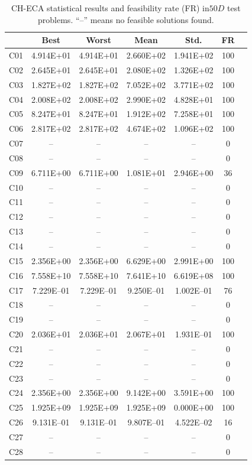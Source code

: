 \documentclass[conference]{IEEEtran}
\begin{document}
% 
% 
% 
\begin{table}[!]
	\caption{CH-ECA statistical results and feasibility rate (FR) in$50D$ test problems. ``--'' means no feasible solutions found.}
	\centering
	\begin{tabular}{|c|c|c|c|c|c|c|}
	\hline
     & Best & Worst & Mean & Std. & FR \\ \hline \hline
C01 & 4.914E+01 & 4.914E+01 & 2.660E+02 & 1.941E+02 &  100 \\ 
C02 & 2.645E+01 & 2.645E+01 & 2.080E+02 & 1.326E+02 &  100 \\ 
C03 & 1.827E+02 & 1.827E+02 & 7.052E+02 & 3.771E+02 &  100 \\ 
C04 & 2.008E+02 & 2.008E+02 & 2.990E+02 & 4.828E+01 &  100 \\ 
C05 & 8.247E+01 & 8.247E+01 & 1.912E+02 & 7.258E+01 &  100 \\ 
C06 & 2.817E+02 & 2.817E+02 & 4.674E+02 & 1.096E+02 &  100 \\ 
C07 &  -- &  -- &  -- &  -- &    0 \\ 
C08 &  -- &  -- &  -- &  -- &    0 \\ 
C09 & 6.711E+00 & 6.711E+00 & 1.081E+01 & 2.946E+00 &   36 \\ 
C10 &  -- &  -- &  -- &  -- &    0 \\ 
C11 &  -- &  -- &  -- &  -- &    0 \\ 
C12 &  -- &  -- &  -- &  -- &    0 \\ 
C13 &  -- &  -- &  -- &  -- &    0 \\ 
C14 &  -- &  -- &  -- &  -- &    0 \\ 
C15 & 2.356E+00 & 2.356E+00 & 6.629E+00 & 2.991E+00 &  100 \\ 
C16 & 7.558E+10 & 7.558E+10 & 7.641E+10 & 6.619E+08 &  100 \\ 
C17 & 7.229E--01 & 7.229E--01 & 9.250E--01 & 1.002E--01 &   76 \\ 
C18 &  -- &  -- &  -- &  -- &    0 \\ 
C19 &  -- &  -- &  -- &  -- &    0 \\ 
C20 & 2.036E+01 & 2.036E+01 & 2.067E+01 & 1.931E--01 &  100 \\ 
C21 &  -- &  -- &  -- &  -- &    0 \\ 
C22 &  -- &  -- &  -- &  -- &    0 \\ 
C23 &  -- &  -- &  -- &  -- &    0 \\ 
C24 & 2.356E+00 & 2.356E+00 & 9.142E+00 & 3.591E+00 &  100 \\ 
C25 & 1.925E+09 & 1.925E+09 & 1.925E+09 & 0.000E+00 &  100 \\ 
C26 & 9.131E--01 & 9.131E--01 & 9.807E--01 & 4.522E--02 &   16 \\ 
C27 &  -- &  -- &  -- &  -- &    0 \\ 
C28 &  -- &  -- &  -- &  -- &    0 \\ 
\hline
	\end{tabular}
	\label{tab:d50}
\end{table}
\end{document}
